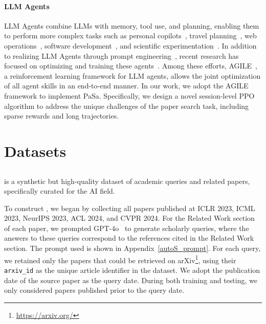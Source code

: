 \paragraph{LLM Agents}
LLM Agents combine LLMs with memory, tool use, and planning, enabling them to perform more complex tasks such as personal copilots~\citep{stratton2024introduction}, travel planning~\citep{gundawar2024robust}, web operations~\citep{deng2024mind2web}, software development~\citep{qian2023communicative}, and scientific experimentation~\citep{bran2023chemcrow}. In addition to realizing LLM Agents through prompt engineering~\cite{park2023generative,yao2023react,shinn2024reflexion,chen2023autoagents}, recent research has focused on optimizing and training these agents~\cite{feng2024agile,putta2024agent,liu2023reason}. Among these efforts, AGILE~\cite{feng2024agile}, a reinforcement learning framework for LLM agents, allows the joint optimization of all agent skills in an end-to-end manner. In our work, we adopt the AGILE framework to implement PaSa. Specifically, we design a novel session-level PPO algorithm to address the unique challenges of the paper search task, including sparse rewards and long trajectories.

\section{Datasets}

\subsection{\autoS} \label{sec:AutoScholarQuery}

\autoS is a synthetic but high-quality dataset of academic queries and related papers, specifically curated for the AI field.

To construct \autoS, we began by collecting all papers published at ICLR 2023, ICML 2023, NeurIPS 2023, ACL 2024, and CVPR 2024. For the Related Work section of each paper, we prompted GPT-4o~\cite{hurst2024gpt} to generate scholarly queries, where the answers to these queries correspond to the references cited in the Related Work section. The prompt used is shown in Appendix~\ref{autoS_prompt}. For each query, we retained only the papers that could be retrieved on arXiv\footnote{\url{https://arxiv.org/}}, using their \texttt{arxiv\_id} as the unique article identifier in the dataset. We adopt the publication date of the source paper as the query date. During both training and testing, we only considered papers published prior to the query date.

